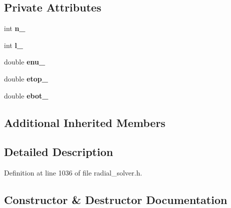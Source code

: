 \subsection*{Private Attributes}
\begin{DoxyCompactItemize}
\item 
\hypertarget{classsirius_1_1_enu__finder_a8924b54fb971cde5dcfeaa37f72847d3}{}int {\bfseries n\+\_\+}\label{classsirius_1_1_enu__finder_a8924b54fb971cde5dcfeaa37f72847d3}

\item 
\hypertarget{classsirius_1_1_enu__finder_a8a65ad8d2787377a90c301b548f053c8}{}int {\bfseries l\+\_\+}\label{classsirius_1_1_enu__finder_a8a65ad8d2787377a90c301b548f053c8}

\item 
\hypertarget{classsirius_1_1_enu__finder_afe6360bffe8fa844ceab914aa8fc5b61}{}double {\bfseries enu\+\_\+}\label{classsirius_1_1_enu__finder_afe6360bffe8fa844ceab914aa8fc5b61}

\item 
\hypertarget{classsirius_1_1_enu__finder_aa69abe2225d851d8b5b8bda93781dcca}{}double {\bfseries etop\+\_\+}\label{classsirius_1_1_enu__finder_aa69abe2225d851d8b5b8bda93781dcca}

\item 
\hypertarget{classsirius_1_1_enu__finder_adb64caa030054cea7c9e01a8facc65ce}{}double {\bfseries ebot\+\_\+}\label{classsirius_1_1_enu__finder_adb64caa030054cea7c9e01a8facc65ce}

\end{DoxyCompactItemize}
\subsection*{Additional Inherited Members}


\subsection{Detailed Description}


Definition at line 1036 of file radial\+\_\+solver.\+h.



\subsection{Constructor \& Destructor Documentation}
\hypertarget{classsirius_1_1_enu__finder_ac5320110052216e2875faf782bd85e54}{}
